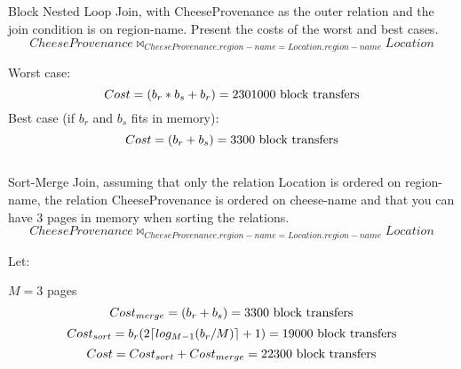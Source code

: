 	

	\subsection{}
	{\color{gray} Block Nested Loop Join, with CheeseProvenance as the outer relation and the join condition is on region-name. Present the costs of the worst and best cases.}
	\begin{equation}CheeseProvenance \bowtie_{CheeseProvenance.region-name=Location.region-name} Location\end{equation}

	Worst case:
	\begin{equation}Cost = (b_r * b_s + b_r) = 2301000 $ block transfers$\end{equation}
	Best case (if $b_r$ and $b_s$ fits in memory):
	\begin{equation}Cost = (b_r + b_s) = 3300 $ block transfers$\end{equation}
	

	\subsection{}
	{\color{gray}Sort-Merge Join, assuming that only the relation Location is ordered on region-name, the relation CheeseProvenance is ordered on cheese-name and that you can have 3 pages in memory when sorting the relations.}
	\begin{equation}CheeseProvenance \bowtie_{CheeseProvenance.region-name=Location.region-name} Location\end{equation}

	Let:

	\tab $M = 3$ pages
	\begin{equation}Cost_{merge} = (b_r + b_s) = 3300 $ block transfers$\end{equation}
	\begin{equation}Cost_{sort} = b_r(2\lceil log_{M-1}(b_r/M) \rceil+1) = 19000 $ block transfers$ \end{equation}
	\begin{equation}Cost = Cost_{sort} + Cost_{merge} = 22300 $ block transfers$\end{equation}	


